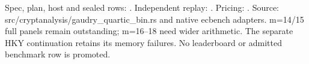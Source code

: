 \documentclass[10pt]{article}
\begin{document}
Spec, plan, host and sealed rows: .
Independent replay: .
Pricing: .
Source: src/cryptanalysis/gaudry_quartic_bin.rs and native ecbench adapters.
m=14/15 full panels remain outstanding; m=16--18 need wider arithmetic.
The separate HKY continuation retains its memory failures. No leaderboard
or admitted benchmark row is promoted.
\end{document}
